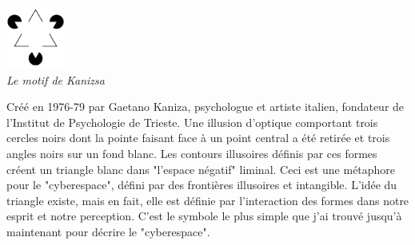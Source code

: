 \documentclass[11pt,twoside,a4paper]{book}
\begin{document}
\begin{minipage}[ht]{0.20\textwidth}
	\footnotesize \centering
	\includegraphics[width=55pt]{img/Kanizsa_triangle.png} ~\\
	\emph{Le motif de Kanizsa}
\end{minipage} \hfill \begin{minipage}[ht]{0.75\textwidth}
	\footnotesize
	Cr{\'e}{\'e} en 1976-79 par Gaetano Kaniza, psychologue et artiste italien, fondateur de l'Institut de Psychologie de Trieste. Une illusion d'optique comportant trois cercles noirs dont la pointe faisant face {\`a} un point central a {\'e}t{\'e} retir{\'e}e et trois angles noirs sur un fond blanc. Les contours illusoires d{\'e}finis par ces formes cr{\'e}ent un triangle blanc dans "l'espace n{\'e}gatif" liminal. Ceci est une m{\'e}taphore pour le "cyberespace", d{\'e}fini par des fronti{\`e}res illusoires et intangible. L'id{\'e}e du triangle existe, mais en fait, elle est d{\'e}finie par l'interaction des formes dans notre esprit et notre perception. C'est le symbole le plus simple que j'ai trouv{\'e} jusqu'{\`a} maintenant pour d{\'e}crire le "cyberespace".
\end{minipage} ~\\
\end{document}
